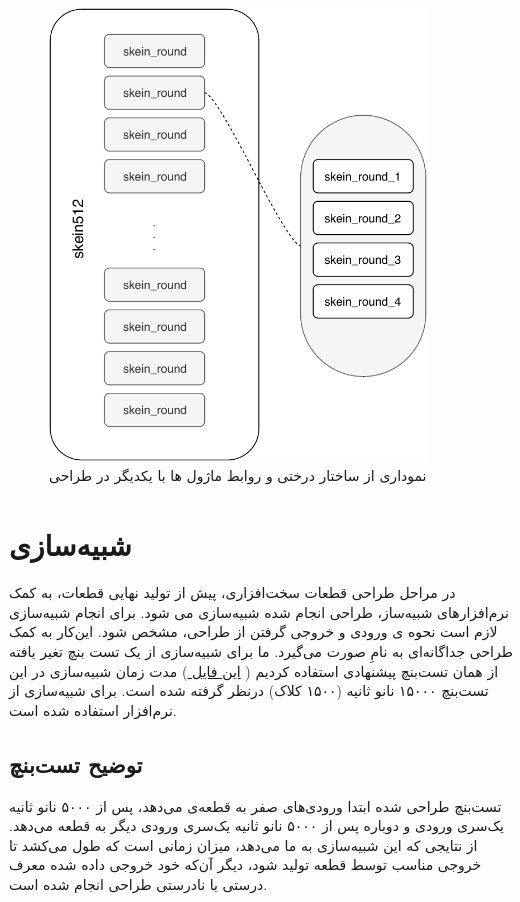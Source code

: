  
 \begin{figure}[H]
 	\centering
 	\includegraphics[width=10cm]{Images/VerilogDocumentation/modules_hierarchy.pdf}	
 	\caption{
 		نموداری از ساختار درختی و روابط ماژول ها با یکدیگر در طراحی
 	}
 \end{figure}
\section{
شبیه‌سازی
}
در مراحل طراحی قطعات سخت‌افزاری، پیش از تولید نهایی قطعات، به کمک نرم‌افزار‌های شبیه‌ساز، طراحی انجام شده شبیه‌سازی می شود. برای انجام شبیه‌سازی لازم است نحوه ی ورودی و خروجی گرفتن از طراحی، مشخص شود. این‌کار به کمک طراحی جداگانه‌ای به نامِ
\textit{}
صورت می‌گیرد. ما برای شبیه‌سازی از یک تست بنچ تغیر یافته از همان تست‌بنچ پیشنهادی استفاده کردیم ( 
\href{https://github.com/VahidZee/SkeinHashingHDL/blob/master/SourceCode/Verilog/testbench.v}
{
	این فایل
} 
)
مدت زمان شبیه‌سازی در این تست‌بنچ ۱۵۰۰۰ نانو ثانیه (۱۵۰۰ کلاک) درنظر گرفته شده است. برای شبیه‌سازی از نرم‌افزار 
\textit{}
استفاده شده است.
\subsection{توضیح تست‌بنچ}
تست‌بنچ طراحی شده ابتدا ورودی‌های صفر به قطعه‌ی
می‌دهد، پس از ۵۰۰۰ نانو ثانیه یک‌سری ورودی و دوباره پس از ۵۰۰۰ ‌نانو ثانیه یک‌سری ورودی دیگر به قطعه می‌دهد. از نتایجی که این شبیه‌سازی به ما می‌دهد، میزان زمانی است که طول می‌کشد تا خروجی مناسب توسط قطعه تولید شود، دیگر آن‌که خود خروجی داده شده معرف درستی یا نا‌درستی طراحی انجام شده است.


